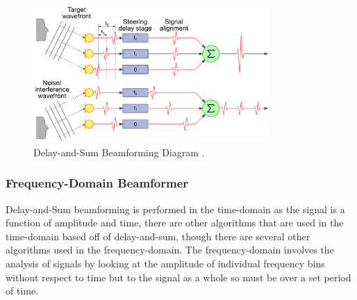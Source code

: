 \documentclass{UoNMCHA}
\numberwithin{equation}{section}
\begin{document}
    \begin{figure}[H]
        \centering
        \includegraphics[keepaspectratio, width = 0.8\textwidth]{Figures/DAS-Diagram.png}
        \caption{Delay-and-Sum Beamforming Diagram \citep{GreWeb}.}
        \label{fig:das-diagram}
    \end{figure}
\subsubsection{Frequency-Domain Beamformer} \label{sec:Freq-Domain Beamformer}
    Delay-and-Sum beamforming is performed in the time-domain as the signal is a function of amplitude and time, there are other algorithms that are used in the time-domain based off of delay-and-sum, though there are several other algorithms used in the frequency-domain. The frequency-domain involves the analysis of signals by looking at the amplitude of individual frequency bins without respect to time but to the signal as a whole so must be over a set period of time. 
    
\end{document}
